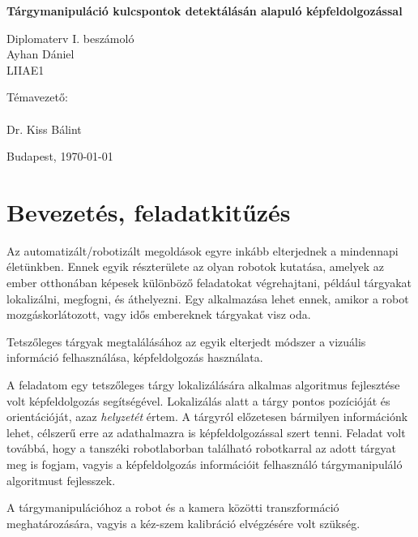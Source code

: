 \documentclass{article}
\begin{document}
	\begin{titlepage}	
		\vspace*{5 cm}
		\begin{center}
			\Huge \textbf{Tárgymanipuláció kulcspontok detektálásán alapuló képfeldolgozással}
			\LARGE
			
			Diplomaterv I. beszámoló\\
			\vspace{12pt} \normalsize
			Ayhan Dániel\\
			LIIAE1
		\end{center}
		\vspace{6 cm}
		Témavezető:\\
		\\		
		Dr. Kiss Bálint
		\begin{center}		
			\vfill
			Budapest, \today	
		\end{center}
	\end{titlepage}
	\newpage
	
	\thispagestyle{empty}
	\tableofcontents
	
	\setlength{\parindent}{0 em}	
	\setlength{\parskip}{1em}
	
	\newpage
	\setcounter{page}{1}
	\section{Bevezetés, feladatkitűzés}
	Az automatizált/robotizált megoldások egyre inkább elterjednek a mindennapi életünkben. Ennek egyik részterülete az olyan robotok kutatása, amelyek az ember otthonában képesek különböző feladatokat végrehajtani, például tárgyakat lokalizálni, megfogni, és áthelyezni. Egy alkalmazása lehet ennek, amikor a robot mozgáskorlátozott, vagy idős embereknek tárgyakat visz oda.
	
	Tetszőleges tárgyak megtalálásához az egyik elterjedt módszer a vizuális információ felhasználása, képfeldolgozás használata.
	
	A feladatom egy tetszőleges tárgy lokalizálására alkalmas algoritmus fejlesztése volt képfeldolgozás segítségével. Lokalizálás alatt a tárgy pontos pozícióját és orientációját, azaz \textit{helyzetét} értem. A tárgyról előzetesen bármilyen információnk lehet, célszerű erre az adathalmazra is képfeldolgozással szert tenni. Feladat volt továbbá, hogy a tanszéki robotlaborban található robotkarral az adott tárgyat meg is fogjam, vagyis a képfeldolgozás információit felhasználó tárgymanipuláló algoritmust fejlesszek.
	
	A tárgymanipulációhoz a robot és a kamera közötti transzformáció meghatározására, vagyis a kéz-szem kalibráció elvégzésére volt szükség.
	
\end{document}
